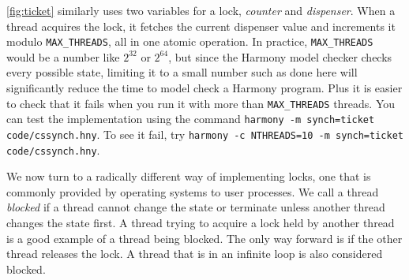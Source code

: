 \documentclass{report}
\begin{document}
\autoref{fig:ticket} similarly uses two variables for a lock,
\textit{counter} and \textit{dispenser}.  When a thread acquires the
lock, it fetches the current dispenser value and increments it
modulo \texttt{MAX\_THREADS}, all in one atomic operation.
In practice, \texttt{MAX\_THREADS} would
be a number like $2^32$ or $2^64$, but since the Harmony model checker
checks every possible state, limiting it to a small number such as done
here will significantly reduce the time to model check a Harmony program.
Plus it is easier to check that it fails when you run it with more than
\texttt{MAX\_THREADS} threads.
You can test the implementation using the command
\texttt{harmony -m synch=ticket code/cssynch.hny}.
To see it fail, try
\texttt{harmony -c NTHREADS=10 -m synch=ticket code/cssynch.hny}.

%

We now turn to a radically different way of implementing locks, one
that is commonly provided by operating systems to user processes.
We call a thread \emph{blocked}
%
if a thread cannot change the state or terminate unless
another thread changes the state first.
A thread trying to acquire a lock held by another thread is a good example
of a thread being blocked.
The only way forward is if the other thread releases the lock.
A thread that is in an infinite loop is also considered blocked.
\end{document}
